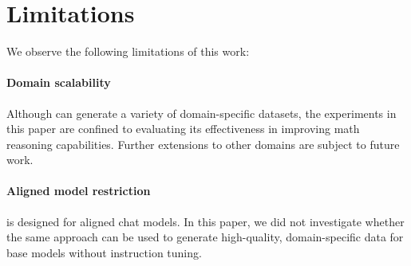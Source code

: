 \section*{Limitations}

We observe the following limitations of this work:

\paragraph{Domain scalability}
Although {\langname} can generate a variety of domain-specific datasets, the experiments in this paper are confined to evaluating its effectiveness in improving math reasoning capabilities. Further extensions to other domains are subject to future work.

\paragraph{Aligned model restriction}
{\langname} is designed for aligned chat models. In this paper, we did not investigate whether the same approach can be used to generate high-quality, domain-specific data for base models without instruction tuning.




